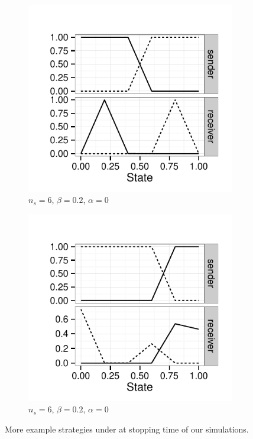 \documentclass[fleqn,reqno,10pt]{article}
\newcommand{\rdd}{\acro{rdd}} %
\newcommand{\imprecision}{\ensuremath{\alpha}} %
\newcommand{\toler}{\ensuremath{\beta}} %
\newcommand{\ns}{\ensuremath{n_s}} %
\begin{document}
\begin{figure}
  \centering

  \begin{subfigure}[]{0.45\textwidth}
    \includegraphics[width=\textwidth]{plots/strat_example_ind21.pdf}
    \caption{$\ns = 6$, $\toler = 0.2$, $\imprecision = 0$}
    \label{fig:example_stratsC}
  \end{subfigure}
  \hfill
  \begin{subfigure}[]{0.45\textwidth}
    \includegraphics[width=\textwidth]{plots/strat_example_ind23.pdf}
    \caption{$\ns = 6$, $\toler = 0.2$, $\imprecision = 0$}
    \label{fig:example_stratsD}
  \end{subfigure}

  \caption{More example strategies under \rdd at stopping time of our simulations.}
  \label{fig:MoreExample_strats}
\end{figure}
\end{document}
